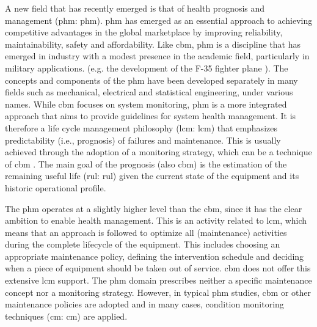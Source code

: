 A new field that has recently emerged is that of health prognosis and management (\acrlong{phm}: \acrshort{phm}). \acrshort{phm} has emerged as an essential approach to achieving competitive advantages in the global marketplace by improving reliability, maintainability, safety and affordability. Like \acrshort{cbm}, \acrshort{phm} is a discipline that has emerged in industry with a modest presence in the academic field, particularly in military applications\cite{Tinga2014}. (e.g. the development of the F-35 fighter plane \cite{Brown2007}).
The concepts and components of the \acrshort{phm} have been developed separately in many fields such as mechanical, electrical and statistical engineering, under various names\cite{Tsui2015}. While \acrshort{cbm} focuses on system monitoring, \acrshort{phm} is a more integrated approach that aims to provide guidelines for system health management. It is therefore a life cycle management philosophy (\acrlong{lcm}: \acrshort{lcm}) that emphasizes predictability (i.e., prognosis) of failures and maintenance. This is usually achieved through the adoption of a monitoring strategy, which can be a technique of \acrshort{cbm} \cite{Tinga2014}. The main goal of the prognosis (also \acrshort{cbm}) is the estimation of the remaining useful life (\acrlong{rul}: \acrshort{rul}) given the current state of the equipment and its historic operational profile\cite{Jardine2006}.

The \acrshort{phm} operates at a slightly higher level than the \acrshort{cbm}, since it has the clear ambition to enable health management. This is an activity related to \acrshort{lcm}, which means that an approach is followed to optimize all (maintenance) activities during the complete lifecycle of the equipment. This includes choosing an appropriate maintenance policy, defining the intervention schedule and deciding when a piece of equipment should be taken out of service. \acrshort{cbm} does not offer this extensive \acrshort{lcm} support. The \acrshort{phm} domain prescribes neither a specific maintenance concept nor a monitoring strategy. However, in typical \acrshort{phm} studies, \acrshort{cbm} or other maintenance policies are adopted and in many cases, condition monitoring techniques (\acrlong{cm}: \acrshort{cm}) are applied\cite{Tinga2014}.

